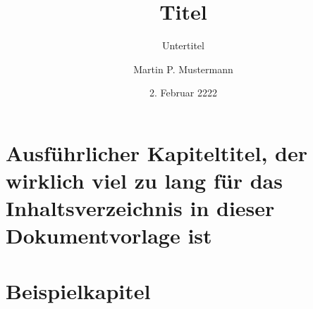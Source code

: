 \documentclass[arbeit=master,oneside]{ArbeitRST}
\begin{document}
\author{Martin P. Mustermann}
\title{Titel}
\subtitle{Untertitel}
\date{2. Februar 2222}
\maketitle
\selbststaendigkeitserklaerung
\tableofcontents


\chapter[kurzer Titel]{Ausführlicher Kapiteltitel, der wirklich viel zu lang für das Inhaltsverzeichnis in dieser Dokumentvorlage ist}
\blindtext[6]
\chapter{Beispielkapitel}
\blindtext[4]
\end{document}
